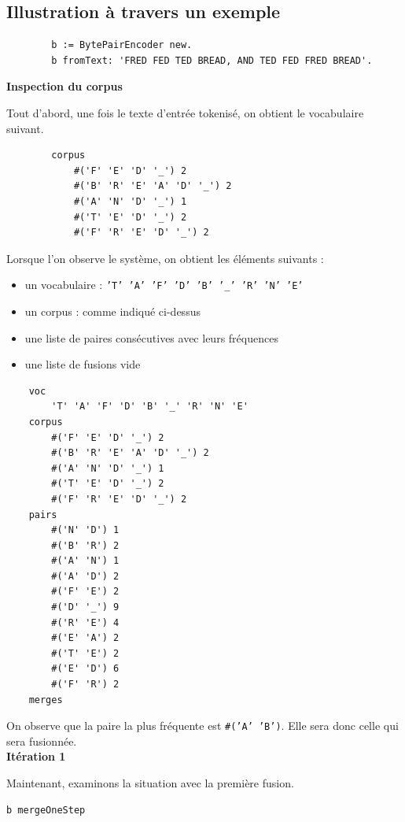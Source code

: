 \documentclass[12pt,a4paper]{report}
\begin{document}
\subsection{Illustration à travers un exemple}

	\begin{verbatim}
		b := BytePairEncoder new.
		b fromText: 'FRED FED TED BREAD, AND TED FED FRED BREAD'.
	\end{verbatim}
	
\textbf{Inspection du corpus}

Tout d’abord, une fois le texte d’entrée tokenisé, on obtient le vocabulaire suivant.

	\begin{verbatim}
		corpus  
			#('F' 'E' 'D' '_') 2
			#('B' 'R' 'E' 'A' 'D' '_') 2
			#('A' 'N' 'D' '_') 1
			#('T' 'E' 'D' '_') 2
			#('F' 'R' 'E' 'D' '_') 2
	\end{verbatim}
	
Lorsque l’on observe le système, on obtient les éléments suivants :

\begin{itemize}
	\item un vocabulaire : \texttt{'T' 'A' 'F' 'D' 'B' '\_' 'R' 'N' 'E'}
	\item un corpus : comme indiqué ci-dessus
	\item une liste de paires consécutives avec leurs fréquences
	\item une liste de fusions vide
\end{itemize}

\begin{verbatim}
	voc  
		'T' 'A' 'F' 'D' 'B' '_' 'R' 'N' 'E'
	corpus  
		#('F' 'E' 'D' '_') 2
		#('B' 'R' 'E' 'A' 'D' '_') 2
		#('A' 'N' 'D' '_') 1
		#('T' 'E' 'D' '_') 2
		#('F' 'R' 'E' 'D' '_') 2
	pairs  
		#('N' 'D') 1
		#('B' 'R') 2
		#('A' 'N') 1
		#('A' 'D') 2
		#('F' 'E') 2
		#('D' '_') 9
		#('R' 'E') 4
		#('E' 'A') 2
		#('T' 'E') 2
		#('E' 'D') 6
		#('F' 'R') 2
	merges 
\end{verbatim}

On observe que la paire la plus fréquente est \texttt{\#('A'~'B')}. Elle sera donc celle qui sera fusionnée.\\

\textbf{Itération 1}

Maintenant, examinons la situation avec la première fusion.

\begin{verbatim}
b mergeOneStep
\end{verbatim}
\end{document}
